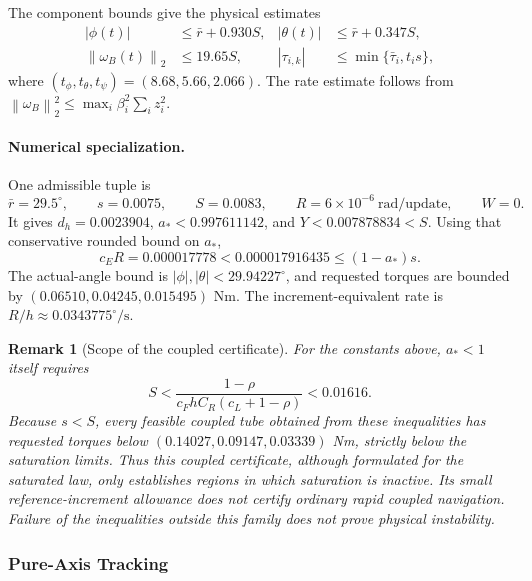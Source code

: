 \documentclass[12pt, a4paper]{article}
\newtheorem{remark}{Remark}
\begin{document}
The component bounds give the physical estimates
\begin{equation}
 \begin{aligned}
  |\phi(t)|&\le\bar r+0.930S,&
  |\theta(t)|&\le\bar r+0.347S,\\
  \left\lVert \omega_B(t)\right\rVert_{2}&\le19.65S,&
  |\tau_{i,k}|&\le\min\{\bar\tau_i,t_i s\},
 \end{aligned}
 \label{eq:parametric_physical_bounds}
\end{equation}
where $(t_\phi,t_\theta,t_\psi)=(8.68,5.66,2.066)$.
The rate estimate follows from
$\left\lVert \omega_B\right\rVert_{2}^2\le\max_i\beta_i^2\sum_i z_i^2$.

\paragraph{Numerical specialization.}
One admissible tuple is
\[
 \bar r=29.5^\circ,\qquad s=0.0075,\qquad S=0.0083,
 \qquad R=6\times10^{-6}\ \mathrm{rad/update},\qquad W=0.
\]
It gives $d_h=0.0023904$, $a_*<0.997611142$, and
$Y<0.007878834<S$. Using that conservative rounded bound on $a_*$,
\[
 c_ER=0.000017778<0.000017916435\le(1-a_*)s.
\]
The actual-angle bound is
$|\phi|,|\theta|<29.94227^\circ$, and requested torques are bounded by
$(0.06510,0.04245,0.015495)$ Nm. The increment-equivalent rate is
$R/h\approx0.0343775^\circ/\mathrm{s}$.

\begin{remark}[Scope of the coupled certificate]
For the constants above, $a_*<1$ itself requires
\begin{equation}
 S<\frac{1-\rho}{c_FhC_R(c_L+1-\rho)}
 <0.01616.
 \label{uhrc:eq:coupled-size-ceiling}
\end{equation}
Because $s<S$, every feasible coupled tube obtained from these inequalities
has requested torques below
$(0.14027,0.09147,0.03339)$ Nm, strictly below the saturation limits.
Thus this coupled certificate, although formulated for the saturated law,
only establishes regions in which saturation is inactive. Its small
reference-increment allowance does not certify ordinary rapid coupled
navigation. Failure of the inequalities outside this family does not prove
physical instability.
\end{remark}

\subsubsection{Pure-Axis Tracking}
\label{uhrc:sec:planar}
\end{document}
